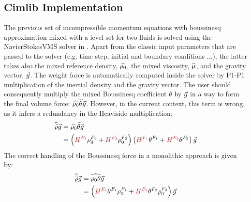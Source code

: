 \documentclass[11pt,a4paper]{article}
\begin{document}
\subsection*{Cimlib Implementation}
The previous set of incompressible momentum equations with boussinesq approximation mixed with a level set for two fluids is solved
using the \textsf{NavierStokesVMS} solver in \cimlib. Apart from the classic input parameters that are passed to the solver (e.g. 
time step, initial and boundary conditions ...), the latter takes also the mixed reference density, $\widehat{\rho_0}$, the mixed 
viscosity, $\widehat{\mu}$, and the gravity vector, $\vec{g}$. The weight force is automatically computed inside the solver by 
P1-P1 multiplication of the inertial density and the gravity vector. The user should consequently multiply the mixed Boussinesq coefficient $\theta$ by $\vec{g}$
in a way to form the final volume force: $\widehat{\rho_0} \widehat{\theta} \vec{g} $.
However, in the current context, this term is wrong, as it infers a redundancy in the Heaviside multiplication:
\begin{align}	
\mix{\rhobouss} \gravity &= \mix{\rho_0} \mix{\theta} \gravity \\
						 &= \brac{\red{\heaviside^{F_1}} \rho_0^{F_1} + \red{\heaviside^{F_2}} \rho_0^{F_2}} \brac{\red{\heaviside^{F_1}} \theta^{F_1} + \red{\heaviside^{F_2} }\theta^{F_2}} \gravity
\end{align}
The correct handling of the Boussinesq force in a monolithic approach is given by:
\begin{align}	
\mix{\rhobouss} \gravity &= \mix{\rho_0 \theta} \gravity \\
						 &= \brac{\red{ \heaviside^{F_1} } \theta^{F_1} \rho_0^{F_1} + \red{\heaviside^{F_2} } \theta^{F_2} \rho_0^{F_2}} \gravity
\end{align}
\end{document}
